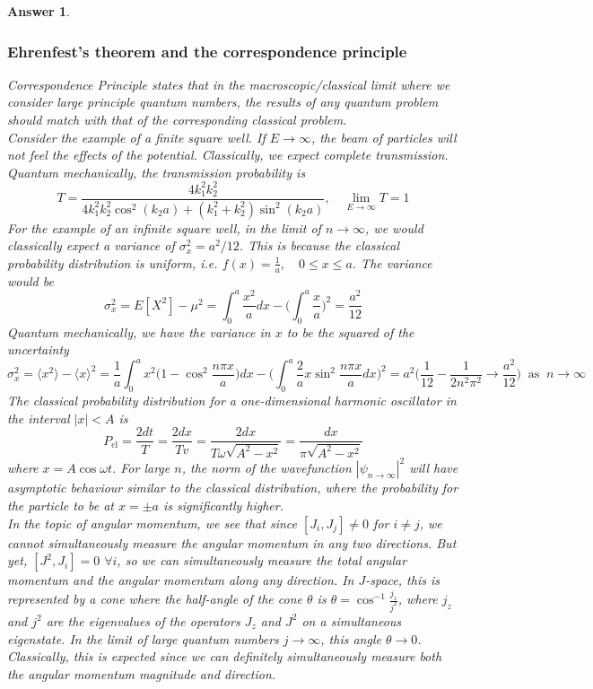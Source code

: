 \documentclass[a4paper]{article}
\newtheorem{ans}{Answer}[subsection]
\theoremstyle{new}
\begin{document}
\begin{ans}
\subsubsection*{Ehrenfest's theorem and the correspondence principle}
Correspondence Principle states that in the macroscopic/classical limit where we consider large principle quantum numbers, the results of any quantum problem should match with that of the corresponding classical problem.\\[5pt]
Consider the example of a finite square well. If $E\rightarrow\infty$, the beam of particles will not feel the effects of the potential. Classically, we expect complete transmission. Quantum mechanically, the transmission probability is
$$T=\frac{4k_1^2k_2^2}{4k_1^2k_2^2\cos^2(k_2a)+(k_1^2+k_2^2)\sin^2(k_2a)},\quad\lim_{E\rightarrow\infty}T=1$$
For the example of an infinite square well, in the limit of $n\rightarrow\infty$, we would classically expect a variance of $\sigma_x^2=a^2/12$. This is because the classical probability distribution is uniform, i.e. $f(x)=\frac{1}{a},\quad 0\leq x\leq a$. The variance would be
$$\sigma_x^2=E[X^2]-\mu^2=\int_0^a\frac{x^2}{a}dx-\bigg(\int_0^a\frac{x}{a}\bigg)^2=\frac{a^2}{12}$$
Quantum mechanically, we have the variance in $x$ to be the squared of the uncertainty
$$\sigma_x^2=\langle x^2\rangle-\langle x\rangle^2=\frac{1}{a}\int_0^ax^2\bigg(1-\cos^2\frac{n\pi x}{a}\bigg)dx-\bigg(\int_0^a\frac{2}{a}x\sin^2\frac{n\pi x}{a}dx\bigg)^2=a^2\bigg(\frac{1}{12}-\frac{1}{2n^2\pi^2}\rightarrow\frac{a^2}{12}\bigg)~\text{ as }~n\rightarrow\infty$$
The classical probability distribution for a one-dimensional harmonic oscillator in the interval $|x|<A$ is
$$P_{\text{cl}}=\frac{2dt}{T}=\frac{2dx}{Tv}=\frac{2dx}{T\omega\sqrt{A^2-x^2}}=\frac{dx}{\pi\sqrt{A^2-x^2}}$$
where $x=A\cos\omega t$. For large $n$, the norm of the wavefunction $|\psi_{n\rightarrow\infty}|^2$ will have asymptotic behaviour similar to the classical distribution, where the probability for the particle to be at $x=\pm a$ is significantly higher.\\[5pt]
In the topic of angular momentum, we see that since $[J_i,J_j]\neq 0$ for $i\neq j$, we cannot simultaneously measure the angular momentum in any two directions. But yet, $[J^2,J_i]=0$ $\forall i$, so we can simultaneously measure the total angular momentum and the angular momentum along any direction. In $J$-space, this is represented by a cone where the half-angle of the cone $\theta$ is $\theta=\cos^{-1}\frac{j_z}{j^2}$, where $j_z$ and $j^2$ are the eigenvalues of the operators $J_z$ and $J^2$ on a simultaneous eigenstate. In the limit of large quantum numbers $j\rightarrow\infty$, this angle $\theta\rightarrow 0$. Classically, this is expected since we can definitely simultaneously measure both the angular momentum magnitude and direction.\\[5pt]

\end{ans}
\end{document}
